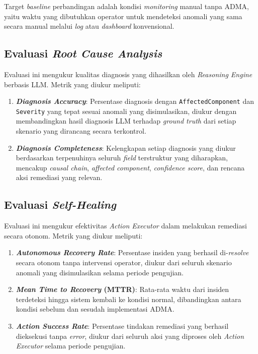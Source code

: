 Target \textit{baseline} perbandingan adalah kondisi \textit{monitoring} manual tanpa ADMA, yaitu waktu yang dibutuhkan operator untuk mendeteksi anomali yang sama secara manual melalui \textit{log} atau \textit{dashboard} konvensional.

\subsection{Evaluasi \textit{Root Cause Analysis}}

Evaluasi ini mengukur kualitas diagnosis yang dihasilkan oleh \textit{Reasoning Engine} berbasis LLM. Metrik yang diukur meliputi:

\begin{enumerate}[label=\arabic*., leftmargin=*]
  \item \textbf{\textit{Diagnosis Accuracy}}: Persentase diagnosis dengan \texttt{AffectedComponent} dan \texttt{Severity} yang tepat sesuai anomali yang disimulasikan, diukur dengan membandingkan hasil diagnosis LLM terhadap \textit{ground truth} dari setiap skenario yang dirancang secara terkontrol.
  \item \textbf{\textit{Diagnosis Completeness}}: Kelengkapan setiap diagnosis yang diukur berdasarkan terpenuhinya seluruh \textit{field} terstruktur yang diharapkan, mencakup \textit{causal chain}, \textit{affected component}, \textit{confidence score}, dan rencana aksi remediasi yang relevan.
\end{enumerate}

\subsection{Evaluasi \textit{Self-Healing}}

Evaluasi ini mengukur efektivitas \textit{Action Executor} dalam melakukan remediasi secara otonom. Metrik yang diukur meliputi:

\begin{enumerate}[label=\arabic*., leftmargin=*]
  \item \textbf{\textit{Autonomous Recovery Rate}}: Persentase insiden yang berhasil di-\textit{resolve} secara otonom tanpa intervensi operator, diukur dari seluruh skenario anomali yang disimulasikan selama periode pengujian.
  \item \textbf{\textit{Mean Time to Recovery} (MTTR)}: Rata-rata waktu dari insiden terdeteksi hingga sistem kembali ke kondisi normal, dibandingkan antara kondisi sebelum dan sesudah implementasi ADMA.
  \item \textbf{\textit{Action Success Rate}}: Persentase tindakan remediasi yang berhasil dieksekusi tanpa \textit{error}, diukur dari seluruh aksi yang diproses oleh \textit{Action Executor} selama periode pengujian.
\end{enumerate}

